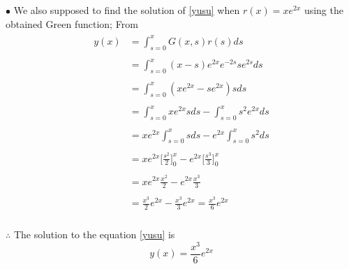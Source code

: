 \documentclass[12pt,a4paper]{article}
\begin{document}
\begin{enumerate}
\begin{enumerate}
$\bullet$ We also supposed to find the solution of \ref{yusu} when $r(x)=xe^{2x}$ using the obtained Green function;
From
\begin{align}
\begin{aligned}
y(x)&=\int_{s=0}^{x}G(x,s)r(s)ds\\\\
&=\int_{s=0}^{x}(x-s)e^{2x}e^{-2s}se^{2s}ds\\\\
&=\int_{s=0}^{x}(xe^{2x}-se^{2x})sds\\\\
&=\int_{s=0}^{x}xe^{2x}sds-\int_{s=0}^{x}s^2e^{2x}ds\\\\
&=xe^{2x}\int_{s=0}^{x}sds-e^{2x}\int_{s=0}^{x}s^2ds\\\\
&=xe^{2x}\bigg[\frac{s^2}{2}\bigg]_{0}^{x}-e^{2x}\bigg[\frac{s^3}{3}\bigg]_{0}^{x}\\\\
&=xe^{2x}\frac{x^2}{2}-e^{2x}\frac{x^3}{3}\\\\
&=\frac{x^3}{2}e^{2x}-\frac{x^3}{3}e^{2x}=\frac{x^3}{6}e^{2x} \\
\end{aligned}
\end{align}

$\therefore$ The solution to the equation \eqref{yusu} is $$y(x)= \frac{x^3}{6}e^{2x} $$
\end{enumerate}
\end{enumerate}
\end{document}
